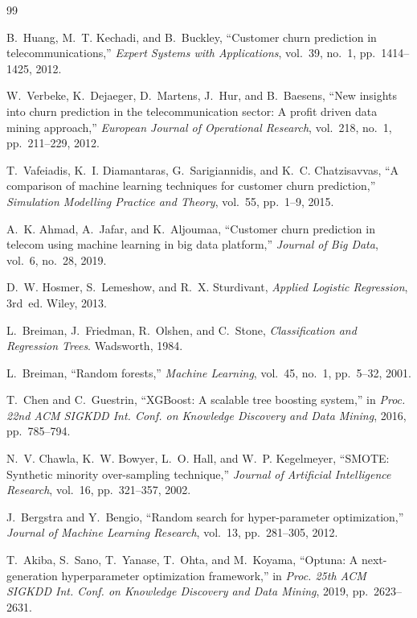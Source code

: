 \begin{thebibliography}{99}

B.~Huang, M.~T. Kechadi, and B.~Buckley,
``Customer churn prediction in telecommunications,''
\textit{Expert Systems with Applications}, vol.~39, no.~1, pp.~1414--1425, 2012.

W.~Verbeke, K.~Dejaeger, D.~Martens, J.~Hur, and B.~Baesens,
``New insights into churn prediction in the telecommunication sector: A profit driven data mining approach,''
\textit{European Journal of Operational Research}, vol.~218, no.~1, pp.~211--229, 2012.

T.~Vafeiadis, K.~I. Diamantaras, G.~Sarigiannidis, and K.~C. Chatzisavvas,
``A comparison of machine learning techniques for customer churn prediction,''
\textit{Simulation Modelling Practice and Theory}, vol.~55, pp.~1--9, 2015.

A.~K. Ahmad, A.~Jafar, and K.~Aljoumaa,
``Customer churn prediction in telecom using machine learning in big data platform,''
\textit{Journal of Big Data}, vol.~6, no.~28, 2019.

D.~W. Hosmer, S.~Lemeshow, and R.~X. Sturdivant,
\textit{Applied Logistic Regression}, 3rd~ed. Wiley, 2013.

L.~Breiman, J.~Friedman, R.~Olshen, and C.~Stone,
\textit{Classification and Regression Trees}. Wadsworth, 1984.

L.~Breiman,
``Random forests,''
\textit{Machine Learning}, vol.~45, no.~1, pp.~5--32, 2001.

T.~Chen and C.~Guestrin,
``XGBoost: A scalable tree boosting system,''
in \textit{Proc. 22nd ACM SIGKDD Int. Conf. on Knowledge Discovery and Data Mining}, 2016, pp.~785--794.

N.~V. Chawla, K.~W. Bowyer, L.~O. Hall, and W.~P. Kegelmeyer,
``SMOTE: Synthetic minority over-sampling technique,''
\textit{Journal of Artificial Intelligence Research}, vol.~16, pp.~321--357, 2002.

J.~Bergstra and Y.~Bengio,
``Random search for hyper-parameter optimization,''
\textit{Journal of Machine Learning Research}, vol.~13, pp.~281--305, 2012.

T.~Akiba, S.~Sano, T.~Yanase, T.~Ohta, and M.~Koyama,
``Optuna: A next-generation hyperparameter optimization framework,''
in \textit{Proc. 25th ACM SIGKDD Int. Conf. on Knowledge Discovery and Data Mining}, 2019, pp.~2623--2631.


\end{thebibliography}
